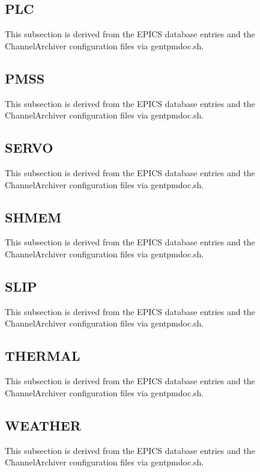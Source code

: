 \subsection{PLC}
 
This subsection is derived from the EPICS database
entries and the ChannelArchiver configuration files
via gentpmdoc.sh.
 
\subsection{PMSS}
 
This subsection is derived from the EPICS database
entries and the ChannelArchiver configuration files
via gentpmdoc.sh.
 
\subsection{SERVO}
 
This subsection is derived from the EPICS database
entries and the ChannelArchiver configuration files
via gentpmdoc.sh.
 
\subsection{SHMEM}
 
This subsection is derived from the EPICS database
entries and the ChannelArchiver configuration files
via gentpmdoc.sh.
 
\subsection{SLIP}
 
This subsection is derived from the EPICS database
entries and the ChannelArchiver configuration files
via gentpmdoc.sh.
 
\subsection{THERMAL}
 
This subsection is derived from the EPICS database
entries and the ChannelArchiver configuration files
via gentpmdoc.sh.
 
\subsection{WEATHER}
 
This subsection is derived from the EPICS database
entries and the ChannelArchiver configuration files
via gentpmdoc.sh.
